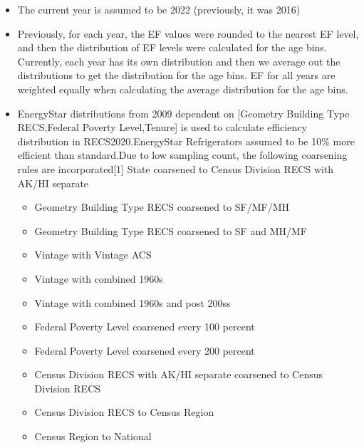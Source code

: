 \begin{itemize}
\item The current year is assumed to be 2022 (previously, it was 2016)
\item Previously, for each year, the EF values were rounded to the nearest EF level, and then the distribution of EF levels were calculated for the age bins. Currently, each year has its own distribution and then we average out the distributions to get the distribution for the age bins. EF for all years are weighted equally when calculating the average distribution for the age bins.
\item EnergyStar distributions from 2009 dependent on [Geometry Building Type RECS,Federal Poverty Level,Tenure] is used to calculate efficiency distribution in RECS2020.EnergyStar Refrigerators assumed to be 10\% more efficient than standard.Due to low sampling count, the following coarsening rules are incorporated[1] State coarsened to Census Division RECS with AK/HI separate
  \begin{itemize}
  \item [2] Geometry Building Type RECS coarsened to SF/MF/MH
  \item [3] Geometry Building Type RECS coarsened to SF and MH/MF
  \item [4] Vintage with Vintage ACS
  \item [5] Vintage with combined 1960s
  \item [6] Vintage with combined 1960s and post 200ss
  \item [7] Federal Poverty Level coarsened every 100 percent
  \item [8] Federal Poverty Level coarsened every 200 percent
  \item [9] Census Division RECS with AK/HI separate coarsened to Census Division RECS
  \item [10] Census Division RECS to Census Region
  \item [11] Census Region to National
  \end{itemize}
\end{itemize}
